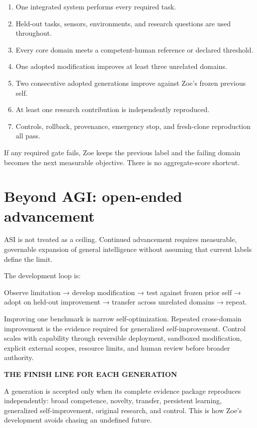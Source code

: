 \documentclass[11pt]{article}
\newcommand{\card}[2]{\colorbox{ZoeLight}{\parbox{0.94\textwidth}{\small\textbf{\color{ZoeCyan!50!black}#1}\par\smallskip #2\par}}}
\begin{document}
\begin{enumerate}
\item One integrated system performs every required task.
\item Held-out tasks, sensors, environments, and research questions are used throughout.
\item Every core domain meets a competent-human reference or declared threshold.
\item One adopted modification improves at least three unrelated domains.
\item Two consecutive adopted generations improve against Zoe's frozen previous self.
\item At least one research contribution is independently reproduced.
\item Controls, rollback, provenance, emergency stop, and fresh-clone reproduction all pass.
\end{enumerate}

If any required gate fails, Zoe keeps the previous label and the failing domain becomes the next measurable objective. There is no aggregate-score shortcut.

\clearpage
\section{Beyond AGI: open-ended advancement}

ASI is not treated as a ceiling. Continued advancement requires measurable, governable expansion of general intelligence without assuming that current labels define the limit.

The development loop is:

\begin{center}
Observe limitation → develop modification → test against frozen prior self → adopt on held-out improvement → transfer across unrelated domains → repeat.
\end{center}

Improving one benchmark is narrow self-optimization. Repeated cross-domain improvement is the evidence required for generalized self-improvement. Control scales with capability through reversible deployment, sandboxed modification, explicit external scopes, resource limits, and human review before broader authority.

\card{THE FINISH LINE FOR EACH GENERATION}{A generation is accepted only when its complete evidence package reproduces independently: broad competence, novelty, transfer, persistent learning, generalized self-improvement, original research, and control. This is how Zoe's development avoids chasing an undefined future.}
\end{document}
